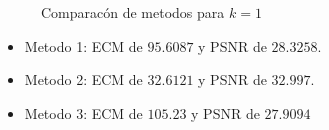\begin{figure}[H]
    \centering
    \qquad
    \qquad
    \caption{Comparacón de metodos para $k = 1$}%
    \label{fig:example}%
\end{figure}

\begin{itemize}
 \item Metodo 1: ECM de $95.6087$ y PSNR de $28.3258$.
 \item Metodo 2: ECM de $32.6121$ y PSNR de $32.997$.
 \item Metodo 3: ECM de $105.23$ y PSNR de $27.9094$
\end{itemize}

